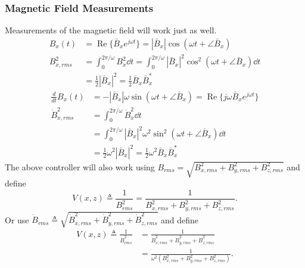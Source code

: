 \subsubsection{Magnetic Field Measurements}
%
Measurements of the magnetic field will work just as well.
%
\begin{align*}
B_{x}(t) &=\operatorname{Re}\{\bar{B}_{x}e^{j\omega t}\}=|\bar{B}_{x}%
|\cos(\omega t+\angle\bar{B}_{x})\\
B_{x,rms}^{2} &=\int_{0}^{2\pi/\omega}B_{x}^{2} \dd t=\int_{0}^{2\pi/\omega
}|\bar{B}_{x}|^{2}\cos^{2}(\omega t+\angle\bar{B}_{x}) \dd t \\ 
&=\frac{1}{2}|\bar {B}_{x}|^{2}=\frac{1}{2}\bar{B}_{x}\bar{B}_{x}^{\ast}%
\end{align*}
%
\begin{align*}
\frac{d}{dt}B_{x}(t) &=-|\bar{B}_{x}|\omega\sin(\omega t+\angle\bar{B}%
_{x})=\operatorname{Re}\{j\omega\bar{B}_{x}e^{j\omega t}\}\\
\dot{B}_{x,rms}^{2} &  =\int_{0}^{2\pi/\omega}\dot{B}_{x}^{2}\dd t \\ &
=\int_{0}%
^{2\pi/\omega}|\bar{B}_{x}|^{2}\omega^{2}\sin^{2}(\omega t+\angle\bar{B}%
_{x})\dd t \\ 
&=\frac{1}{2}\omega^{2}|\bar{B}_{x}|^{2}=\frac{1}{2}\omega^{2}\bar
{B}_{x}\bar{B}_{x}^{\ast}%
\end{align*}
The above controller will also work using $B_{rms}=\sqrt{B_{x,rms}%
^{2}+B_{y,rms}^{2}+B_{z,rms}^{2}}$ and define
\[
V(x,z)\triangleq\frac{1}{B_{rms}^{2}}=\frac{1}{B_{x,rms}^{2}+B_{y,rms}%
^{2}+B_{z,rms}^{2}}.
\]
Or use $\dot{B}_{rms}\triangleq\sqrt{\dot{B}_{x,rms}^{2}+\dot{B}_{y,rms}%
^{2}+\dot{B}_{z,rms}^{2}}$ and define
\begin{align*}
    V(x,z)\triangleq\frac{1}{\dot{B}_{rms}^{2}}&=\frac{1}{\dot{B}_{x,rms}^{2}%
        +\dot{B}_{y,rms}^{2}+\dot{B}_{z,rms}^{2}} \\ &
        =\frac{1}{\omega^{2}(B_{x,rms}%
^{2}+B_{y,rms}^{2}+B_{z,rms}^{2})}.
\end{align*}

